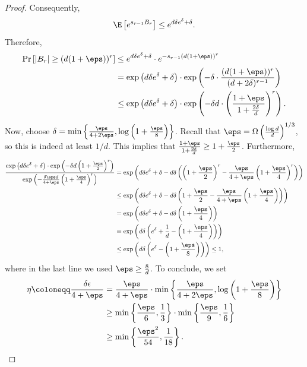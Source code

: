 \documentclass[11pt,letterpaper]{article}
\begin{document}
\begin{proof}
    Consequently,
    \[ \E\left[ e^{s_{r-1} B_r} \right] \le e^{d\delta e^{\delta} + \delta}. \]
    Therefore,
    \begin{align*}
        \Pr\left[ |B_r| \ge (d(1+\eps))^r \right] &\le e^{d\delta e^{\delta} + \delta} \cdot e^{-s_{r-1}(d(1+\eps))^{r}} \\
            &= \exp\left(d\delta e^{\delta} + \delta\right) \cdot \exp\left( - \delta \cdot \frac{(d(1+\eps))^r}{(d+2\delta)^{r-1}} \right) \\
            &\le \exp\left(d\delta e^{\delta} + \delta\right) \cdot \exp\left( - \delta d \cdot \left( \frac{1+\eps}{1+\frac{2\delta}{d}} \right)^r \right).
    \end{align*}
    Now, choose $\delta = \min\left\{\frac{\eps}{4+2\eps} , \log\left( 1 + \frac{\eps}{8} \right)\right\}$. Recall that $\eps = \Omega\left( \frac{\log d}{d} \right)^{1/3}$, so this is indeed at least $1/d$. This implies that $\frac{1+\eps}{1+\frac{2\delta}{d}} \ge 1 + \frac{\eps}{2}$. Furthermore,
    \begin{align*}
        \frac{\exp\left( d \delta e^{\delta} + \delta \right) \cdot \exp\left( - \delta d \left( 1 + \frac{\eps}{2} \right)^r \right)}{ \exp\left( - \frac{\delta\eps d}{4+\eps} \left( 1 + \frac{\eps}{4} \right)^r \right) } &= \exp\left( d \delta e^{\delta} + \delta - d \delta \left(\left( 1 + \frac{\eps}{2} \right)^r - \frac{\eps}{4+\eps} \left( 1 + \frac{\eps}{4} \right)^r \right) \right) \\
            &\le \exp\left( d \delta e^{\delta} + \delta - d \delta \left( 1 + \frac{\eps}{2} - \frac{\eps}{4+\eps} \left( 1 + \frac{\eps}{4} \right) \right) \right) \\
            &= \exp\left( d \delta e^{\delta} + \delta - d \delta \left( 1 + \frac{\eps}{4} \right) \right) \\
            &= \exp\left( d \delta \left( e^{\delta} + \frac{1}{d} - \left( 1 + \frac{\eps}{4} \right) \right) \right) \\
            &\le \exp\left( d \delta \left( e^{\delta} - \left( 1 + \frac{\eps}{8} \right) \right) \right) \le 1,
    \end{align*}
    where in the last line we used $\eps \ge \frac{8}{d}$.
    To conclude, we set
    \begin{align*}
        \eta \coloneqq \frac{\delta \epsilon}{4+\eps} &= \frac{\eps}{4+\eps} \cdot \min \left\{ \frac{\eps}{4+2\eps} , \log \left( 1 + \frac{\eps}{8} \right) \right\} \\
        &\ge \min \left\{ \frac{\eps}{6} , \frac{1}{3} \right\} \cdot \min \left\{ \frac{\eps}{9} , \frac{1}{6} \right\} \\
            &\ge \min\left\{ \frac{\eps^2}{54} , \frac{1}{18} \right\}. \qedhere
    \end{align*}
\end{proof}
\end{document}
